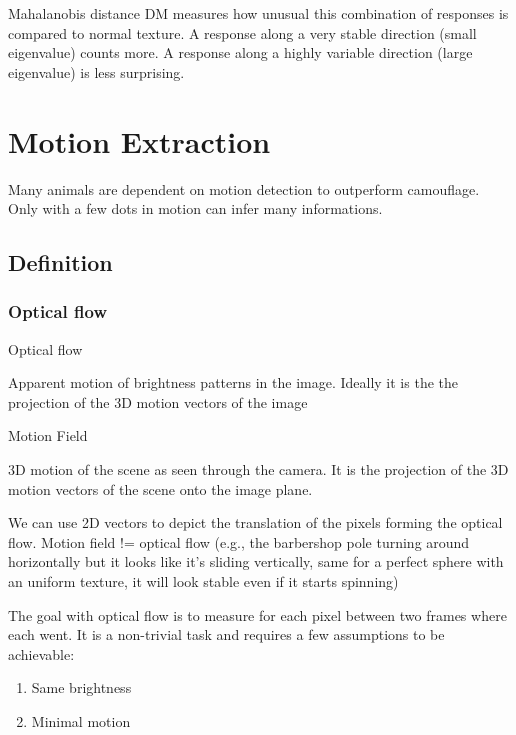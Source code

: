 \documentclass[
  a4paper,
  ,captions=tableheading
]{scrartcl}
\providecommand{\tightlist}{%
  \setlength{\itemsep}{0pt}\setlength{\parskip}{0pt}}
\renewenvironment{quote}{\begin{customblockquote}\list{}{\rightmargin=0em\leftmargin=0em}%
\item\relax\color{blockquote-text}\ignorespaces}{\unskip\unskip\endlist\end{customblockquote}}
\begin{document}
Mahalanobis distance DM measures how unusual this combination of
responses is compared to normal texture. A response along a very stable
direction (small eigenvalue) counts more. A response along a highly
variable direction (large eigenvalue) is less surprising.

\section{Motion Extraction}\label{motion-extraction}

Many animals are dependent on motion detection to outperform camouflage.
Only with a few dots in motion can infer many informations.

\subsection{Definition}\label{definition}

\subsubsection{Optical flow}\label{optical-flow}

\begin{quote}
Optical flow

Apparent motion of brightness patterns in the image. Ideally it is the
the projection of the 3D motion vectors of the image
\end{quote}

\begin{quote}
Motion Field

3D motion of the scene as seen through the camera. It is the projection
of the 3D motion vectors of the scene onto the image plane.
\end{quote}

We can use 2D vectors to depict the translation of the pixels forming
the optical flow. Motion field != optical flow (e.g., the barbershop
pole turning around horizontally but it looks like it's sliding
vertically, same for a perfect sphere with an uniform texture, it will
look stable even if it starts spinning)

The goal with optical flow is to measure for each pixel between two
frames where each went. It is a non-trivial task and requires a few
assumptions to be achievable:

\begin{enumerate}
\def\labelenumi{\arabic{enumi}.}
\tightlist
\item
  Same brightness
\item
  Minimal motion
\end{enumerate}
\end{document}
